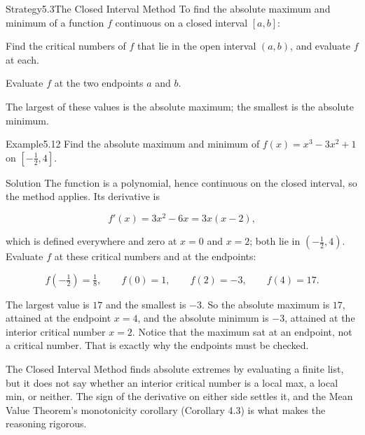 \documentclass[a4paper,12pt,oneside]{memoir}
\begin{document}
\begin{envstrategy}{Strategy}{5.3}{The Closed Interval Method}
To find the absolute maximum and minimum of a function \(f\) continuous on a closed interval \([a, b]\):

\begin{steps}
  \item Find the critical numbers of \(f\) that lie in the open interval \((a, b)\), and evaluate \(f\) at each.
  \item Evaluate \(f\) at the two endpoints \(a\) and \(b\).
  \item The largest of these values is the absolute maximum; the smallest is the absolute minimum.
\end{steps}
\end{envstrategy}
\begin{workedexample}
\begin{envexample}{Example}{5.12}{}
Find the absolute maximum and minimum of \(f(x) = x^{3} - 3x^{2} + 1\) on \([-\tfrac{1}{2}, 4]\).
\end{envexample}
\begin{envsolution}{Solution}{}{}
The function is a polynomial, hence continuous on the closed interval, so the method applies. Its derivative is

\[ f'(x) = 3x^{2} - 6x = 3x(x - 2), \]

which is defined everywhere and zero at \(x = 0\) and \(x = 2\); both lie in \((-\tfrac{1}{2}, 4)\). Evaluate \(f\) at these critical numbers and at the endpoints:

\[ f(-\tfrac{1}{2}) = \tfrac{1}{8}, \qquad f(0) = 1, \qquad f(2) = -3, \qquad f(4) = 17. \]

The largest value is \(17\) and the smallest is \(-3\). So the absolute maximum is \(17\), attained at the endpoint \(x = 4\), and the absolute minimum is \(-3\), attained at the interior critical number \(x = 2\). Notice that the maximum sat at an endpoint, not a critical number. That is exactly why the endpoints must be checked. \qedmark
\end{envsolution}
\end{workedexample}
The Closed Interval Method finds absolute extremes by evaluating a finite list, but it does not say whether an interior critical number is a local max, a local min, or neither. The sign of the derivative on either side settles it, and the Mean Value Theorem’s monotonicity corollary (Corollary 4.3) is what makes the reasoning rigorous.
\end{document}
